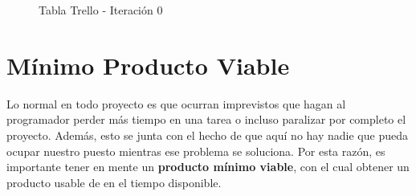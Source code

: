 \begin{figure}[h]
\centering
\caption{Tabla Trello - Iteración 0}
\label{figure:trello}
\end{figure}
	
\section{Mínimo Producto Viable}

Lo normal en todo proyecto es que ocurran imprevistos que hagan al programador perder más tiempo en una tarea o incluso paralizar por completo el proyecto. Además, esto se junta con el hecho de que aquí no hay nadie que pueda ocupar nuestro puesto mientras ese problema se soluciona. Por esta razón, es importante tener en mente un \textbf{producto mínimo viable}, con el cual obtener un producto usable de en el tiempo disponible.
	
\cleardoublepage